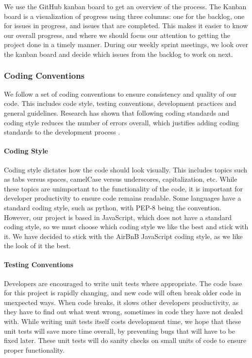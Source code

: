 We use the GitHub kanban board to get an overview of the process. The Kanban board is a
visualization of progress using three columns: one for the backlog, one for issues in
progress, and issues that are completed. This makes it easier to know our overall
progress, and where we should focus our attention to getting the project done in a timely
manner. During our weekly sprint meetings, we look over the kanban board and decide which
issues from the backlog to work on next.

\subsubsection{Coding Conventions}

We follow a set of coding conventions to ensure consistency and quality of our code. This
includes code style, testing conventions, development practices and general guidelines.
Research has shown that following coding standards and coding style reduces the number of
errors overall, which justifies adding coding standards to the development process
\autocite{codingstyle}.

\paragraph{Coding Style}

Coding style dictates how the code should look visually. This includes topics such as tabs
versus spaces, camelCase versus underscores, capitalization, etc. While these topics are
unimportant to the functionality of the code, it is important for developer productivity
to ensure code remains readable. Some languages have a standard coding style, such as
python, with PEP-8 being the convention. However, our project is based in JavaScript,
which does not have a standard coding style, so we must choose which coding style we like
the best and stick with it. We have decided to stick with the AirBnB JavaScript coding
style, as we like the look of it the best.

\paragraph{Testing Conventions}

Developers are encouraged to write unit tests where appropriate. The code base for this
project is rapidly changing, and new code will often break older code in unexpected ways.
When code breaks, it slows other developers productivity, as they have to find out what
went wrong, sometimes in code they have not dealed with. While writing unit tests itself
costs development time, we hope that these unit tests will save more time overall, by
preventing bugs that will have to be fixed later.  These unit tests will do sanity checks
on small units of code to ensure proper functionality.


